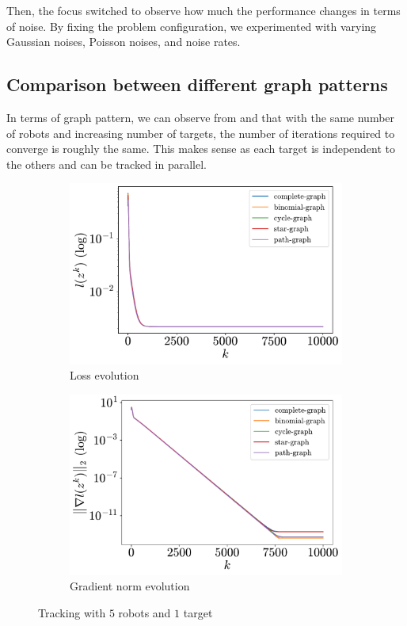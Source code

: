 \documentclass[a4paper,11pt,oneside]{book}
\begin{document}
Then, the focus switched to observe how much the performance changes in terms of noise. By fixing the problem configuration, we experimented with varying Gaussian noises, Poisson noises, and noise rates.


\subsection{Comparison between different graph patterns}

In terms of graph pattern, we can observe from  and  that with the same number of robots and increasing number of targets, the number of iterations required to converge is roughly the same. This makes sense as each target is independent to the others and can be tracked in parallel.

\begin{figure}[H]
      \centering
      \begin{subfigure}[t]{0.46\linewidth}
            \centering
            \includegraphics[width=\linewidth]{./figs/tracking/5_1_2/loss.pdf} 
            \caption{Loss evolution}
      \end{subfigure}
      \hfill
      \begin{subfigure}[t]{0.46\linewidth}
            \centering
            \includegraphics[width=\linewidth]{./figs/tracking/5_1_2/gradient.pdf} 
            \caption{Gradient norm evolution}
      \end{subfigure}
      \caption{Tracking with $5$ robots and $1$ target}
      \label{fig:tracking_5_1}
\end{figure}
\end{document}
